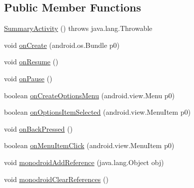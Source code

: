 \subsection*{Public Member Functions}
\begin{DoxyCompactItemize}
\item 
\hyperlink{classfieldservice_1_1android_1_1_summary_activity_afa73673719e62f4fc8d9fc0fa74a5024}{Summary\+Activity} ()  throws java.\+lang.\+Throwable 	
\item 
void \hyperlink{classfieldservice_1_1android_1_1_summary_activity_ac360d2cfc2e74bef59056c4880d1b9d7}{on\+Create} (android.\+os.\+Bundle p0)
\item 
void \hyperlink{classfieldservice_1_1android_1_1_summary_activity_ac72966e27d4ad7528806adfb9c5b4393}{on\+Resume} ()
\item 
void \hyperlink{classfieldservice_1_1android_1_1_summary_activity_a9d2cb53a908830f9c5da217670062b7d}{on\+Pause} ()
\item 
boolean \hyperlink{classfieldservice_1_1android_1_1_summary_activity_ab762e49ef1d9e95be6fbb7f0222dda41}{on\+Create\+Options\+Menu} (android.\+view.\+Menu p0)
\item 
boolean \hyperlink{classfieldservice_1_1android_1_1_summary_activity_ad2e47c92530aa820339e3b5582072938}{on\+Options\+Item\+Selected} (android.\+view.\+Menu\+Item p0)
\item 
void \hyperlink{classfieldservice_1_1android_1_1_summary_activity_a5a4eaf5c2fa44b8ced3fc9e231319645}{on\+Back\+Pressed} ()
\item 
boolean \hyperlink{classfieldservice_1_1android_1_1_summary_activity_a4507d65079e6302cac356660b4bc34c9}{on\+Menu\+Item\+Click} (android.\+view.\+Menu\+Item p0)
\item 
void \hyperlink{classfieldservice_1_1android_1_1_summary_activity_a93929d4f7b08beb0b1ba5e17054c9261}{monodroid\+Add\+Reference} (java.\+lang.\+Object obj)
\item 
void \hyperlink{classfieldservice_1_1android_1_1_summary_activity_aaddae67fae6fc68be4b76846428c3f3c}{monodroid\+Clear\+References} ()
\end{DoxyCompactItemize}


